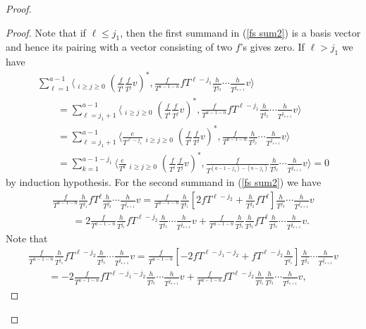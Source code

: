 \documentclass[pdftex]{sigma}
\numberwithin{equation}{section}
\begin{document}
\begin{proof}
\begin{proof}
Note that if $\ell \leq j_1$, then the first summand in (\ref{fs sum2}) is a basis vector and hence its pairing with a vector consisting of two $f$'s gives zero. If $\ell > j_1$ we have
\begin{gather*}
\sum_{\ell=1}^{a-1} \bigg\langle \mathop{\sum_{i+j=a-1-\ell}}_{i\geq j\geq 0} \left(\frac{f}{T^i}\frac{f}{T^j}v\right)^*, \frac{f}{T^{a-1-n}} fT^{\ell-j_1} \frac{h}{T^{j_2}} \cdots \frac{h}{T^{j_{s+1}}} v \bigg\rangle\\
\qquad{} = \sum_{\ell=j_1+1}^{a-1} \bigg\langle \mathop{\sum_{i+j=a-1-\ell}}_{i\geq j\geq 0} \left(\frac{f}{T^i}\frac{f}{T^j}v\right)^*, \frac{f}{T^{a-1-n}} fT^{\ell-j_1} \frac{h}{T^{j_2}} \cdots \frac{h}{T^{j_{s+1}}} v \bigg\rangle \\
\qquad{} = \sum_{\ell=j_1+1}^{a-1} \bigg\langle \frac{e}{T^{\ell-j_1}} \mathop{\sum_{i+j=a-1-\ell}}_{i\geq j\geq 0} \left(\frac{f}{T^i}\frac{f}{T^j}v\right)^*, \frac{f}{T^{a-1-n}} \frac{h}{T^{j_2}} \cdots \frac{h}{T^{j_{s+1}}} v \bigg\rangle \\
\qquad{} = \sum_{k=1}^{a-1-j_1} \bigg\langle \frac{e}{T^{k}} \mathop{\sum_{i+j=a-1-j_1 - k}}_{i\geq j\geq 0} \left(\frac{f}{T^i}\frac{f}{T^j}v\right)^*, \frac{f}{T^{(a-1-j_1)-(n-j_1)}} \frac{h}{T^{j_2}} \cdots \frac{h}{T^{j_{s+1}}} v \bigg\rangle = 0
\end{gather*}
by induction hypothesis. For the second summand in (\ref{fs sum2}) we have
\begin{gather}
\frac{f}{T^{a-1-n}} \frac{h}{T^{j_1}} fT^{\ell} \frac{h}{T^{j_2}} \cdots \frac{h}{T^{j_{s+1}}} v = \frac{f}{T^{a-1-n}} \frac{h}{T^{j_1}} \left[ 2fT^{\ell-j_2} + \frac{h}{T^{j_2}} fT^{\ell} \right] \frac{h}{T^{j_3}} \cdots \frac{h}{T^{j_{s+1}}} v \nonumber \\
\qquad{} = 2 \frac{f}{T^{a-1-n}} \frac{h}{T^{j_1}} fT^{\ell-j_2} \frac{h}{T^{j_3}} \cdots \frac{h}{T^{j_{s+1}}} v + \frac{f}{T^{a-1-n}} \frac{h}{T^{j_1}} \frac{h}{T^{j_2}} fT^{\ell} \frac{h}{T^{j_3}} \cdots \frac{h}{T^{j_{s+1}}} v. \label{2f}
\end{gather}
Note that
\begin{gather*}
\frac{f}{T^{a-1-n}} \frac{h}{T^{j_1}} fT^{\ell-j_2} \frac{h}{T^{j_3}} \cdots \frac{h}{T^{j_{s+1}}} v = \frac{f}{T^{a-1-n}} \left[ -2 fT^{\ell-j_1-j_2} + fT^{\ell-j_2} \frac{h}{T^{j_1}} \right] \frac{h}{T^{j_3}} \cdots \frac{h}{T^{j_{s+1}}} v \\
\qquad{} = -2 \frac{f}{T^{a-1-n}} fT^{\ell-j_1-j_2} \frac{h}{T^{j_3}} \cdots \frac{h}{T^{j_{s+1}}} v + \frac{f}{T^{a-1-n}} fT^{\ell-j_2} \frac{h}{T^{j_1}} \frac{h}{T^{j_3}} \cdots \frac{h}{T^{j_{s+1}}} v,

\end{gather*}
\end{proof}
\end{proof}
\end{document}
